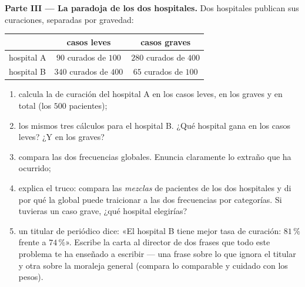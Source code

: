 \begin{problem}
\medskip
\noindent\textbf{Parte III --- La paradoja de los dos
hospitales.}
Dos hospitales publican sus curaciones, separadas por gravedad:
\begin{center}
\renewcommand{\arraystretch}{1.3}
\begin{tabular}{l|cc}
                 & casos leves & casos graves \\
\hline
hospital A & $90$ curados de $100$ & $280$ curados de $400$ \\
hospital B & $340$ curados de $400$ & $65$ curados de $100$ \\
\end{tabular}
\end{center}
\begin{enumerate}[resume]
  \item calcula la  de curación del hospital A en los casos leves, en los
        graves y en total (los $500$ pacientes);
  \item los mismos tres cálculos para el hospital B. ¿Qué hospital
        gana en los casos leves? ¿Y en los graves?
  \item compara las dos frecuencias globales. Enuncia claramente lo
        extraño que ha ocurrido;
  \item explica el truco: compara las \emph{mezclas} de pacientes de los
        dos hospitales y di por qué la  global puede
        traicionar a las dos frecuencias por categorías. Si tuvieras
        un caso grave, ¿qué hospital elegirías?
  \item un titular de periódico dice: «El hospital B tiene mejor
        tasa de curación: $81\,\%$ frente a $74\,\%$». Escribe la
        carta al director de dos frases que todo este
        problema te ha enseñado a escribir --- una frase sobre
        lo que ignora el titular y otra sobre la moraleja general
        (compara lo comparable y cuidado con los pesos).
\end{enumerate}
\end{problem}
